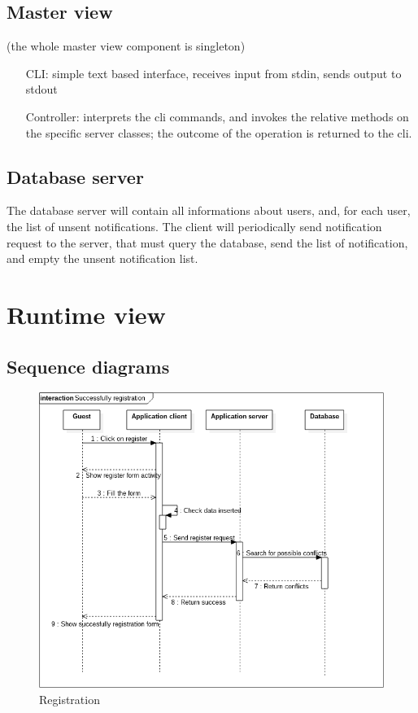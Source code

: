 	\subsection{Master view}
	(the whole master view component is singleton)
	\begin{itemize}
	  \item [CLI:] simple text based interface, receives input from stdin, sends output to stdout
	  \item [Controller:] interprets the cli commands, and invokes the relative methods on the specific server classes;
	  the outcome of the operation is returned to the cli.
	\end{itemize}
	\subsection{Database server}
	The database server will contain all informations about users, and, for each user, the list of unsent notifications.
	The client will periodically send notification request to the server, that must query the database, send the list of notification,
	and empty the unsent notification list.
\section{Runtime view}
	\subsection{Sequence diagrams}
\begin{figure} [h]
\centering
\includegraphics[scale=0.5]{Sequence Diagrams/successfully_registration.png}
\caption{ Registration }
\end{figure}

